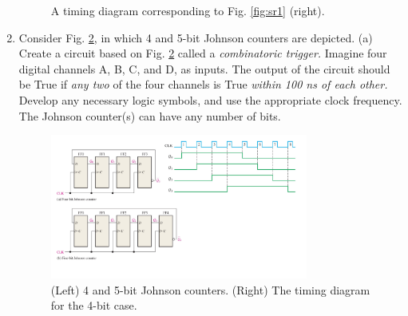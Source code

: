 \documentclass[10pt]{article}
\begin{document}
\begin{enumerate}
\begin{figure}[ht]
\caption{\label{fig:sr2} A timing diagram corresponding to Fig. \ref{fig:sr1} (right).}
\end{figure}
\item Consider Fig. \ref{fig:SRG8}, in which 4 and 5-bit Johnson counters are depicted.  (a) Create a circuit based on Fig. \ref{fig:SRG8} called a \textit{combinatoric trigger.}  Imagine four digital channels A, B, C, and D, as inputs.  The output of the circuit should be True if \textit{any two} of the four channels is True \textit{within 100 ns of each other.}  Develop any necessary logic symbols, and use the appropriate clock frequency.  The Johnson counter(s) can have any number of bits.
\begin{figure}[hb]
\centering
\includegraphics[width=0.8\textwidth]{figures/SRG8.pdf}
\caption{\label{fig:SRG8} (Left) 4 and 5-bit Johnson counters. (Right) The timing diagram for the 4-bit case.}
\end{figure}
\end{enumerate}
\end{document}
